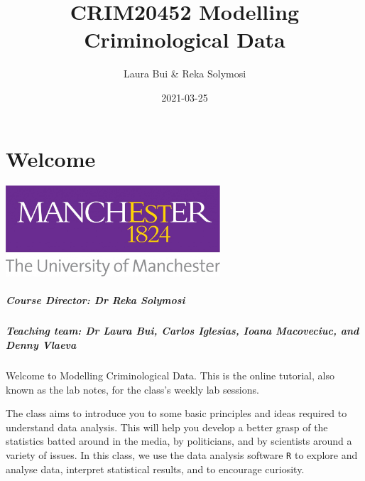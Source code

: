 \documentclass[
]{book}
\title{CRIM20452 Modelling Criminological Data}
\author{Laura Bui \& Reka Solymosi}
\date{2021-03-25}
\begin{document}
\maketitle

{
\setcounter{tocdepth}{1}
\tableofcontents
}
\hypertarget{welcome}{%
\chapter*{Welcome}\label{welcome}}

\includegraphics[width=0.6\textwidth,height=\textheight]{Images/UOM.jpg}

\hypertarget{course-director-dr-reka-solymosi}{%
\paragraph*{Course Director: Dr Reka Solymosi}\label{course-director-dr-reka-solymosi}}

\hypertarget{teaching-team-dr-laura-bui-carlos-iglesias-ioana-macoveciuc-and-denny-vlaeva}{%
\paragraph*{Teaching team: Dr Laura Bui, Carlos Iglesias, Ioana Macoveciuc, and Denny Vlaeva}\label{teaching-team-dr-laura-bui-carlos-iglesias-ioana-macoveciuc-and-denny-vlaeva}}

Welcome to Modelling Criminological Data. This is the online tutorial, also known as the lab notes, for the class's weekly lab sessions.

The class aims to introduce you to some basic principles and ideas required to understand data analysis. This will help you develop a better grasp of the statistics batted around in the media, by politicians, and by scientists around a variety of issues. In this class, we use the data analysis software \texttt{R} to explore and analyse data, interpret statistical results, and to encourage curiosity.
\end{document}
